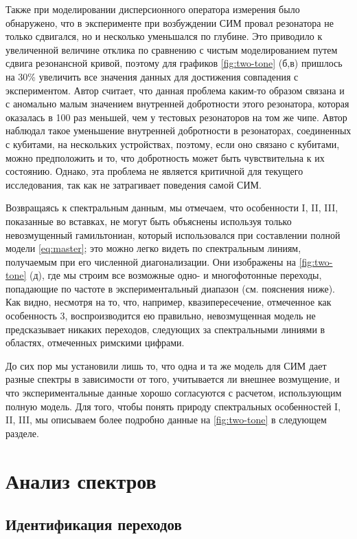 \documentclass[14pt, a4paper]{extreport}
\numberwithin{equation}{section}
\begin{document}
Также при моделировании дисперсионного оператора измерения было обнаружено, что в эксперименте при возбуждении СИМ провал резонатора не только сдвигался, но и несколько уменьшался по глубине. Это приводило к увеличенной величине отклика по сравнению с чистым моделированием путем сдвига резонансной кривой, поэтому для графиков \autoref{fig:two-tone} (б,в) пришлось на 30\% увеличить все значения данных для достижения совпадения с экспериментом. Автор считает, что данная проблема каким-то образом связана и с аномально малым значением внутренней добротности этого резонатора, которая оказалась в 100 раз меньшей, чем у тестовых резонаторов на том же чипе. Автор наблюдал такое уменьшение внутренней добротности в резонаторах, соединенных с кубитами, на нескольких устройствах, поэтому, если оно связано с кубитами, можно предположить и то, что добротность может быть чувствительна к их состоянию. Однако, эта проблема не является критичной для текущего исследования, так как не затрагивает поведения самой СИМ.

Возвращаясь к спектральным данным, мы отмечаем, что особенности I, II, III, показанные во вставках, не могут быть объяснены используя только невозмущенный гамильтониан, который использовался при составлении полной модели \eqref{eq:master}; это можно легко видеть по спектральным линиям, получаемым при его численной диагонализации. Они изображены на \autoref{fig:two-tone} (д), где мы строим все возможные одно- и многофотонные переходы, попадающие по частоте в экспериментальный диапазон (см. пояснения ниже). Как видно, несмотря на то, что, например, квазипересечение, отмеченное как особенность 3, воспроизводится ею правильно, невозмущенная модель не предсказывает никаких переходов, следующих за спектральными линиями в областях, отмеченных римскими цифрами.

До сих пор мы установили лишь то, что одна и та же модель для СИМ дает разные спектры в зависимости от того, учитывается ли внешнее возмущение, и что экспериментальные данные хорошо согласуются с расчетом, использующим полную модель. Для того, чтобы понять природу спектральных особенностей I, II, III, мы описываем более подробно данные на \autoref{fig:two-tone} в следующем разделе.

\section{Анализ спектров}

\subsection{Идентификация переходов}
\end{document}
